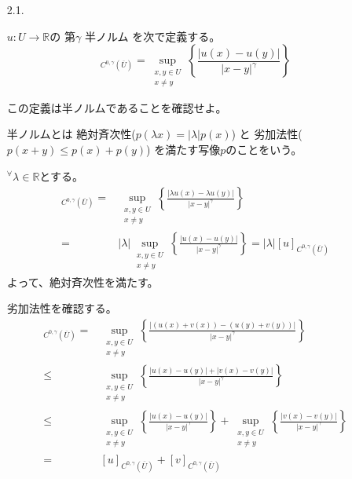 \documentclass[12pt,b5paper]{ltjsarticle}
\begin{document}
\hrulefill

\begin{enumerate}
 \item [2.1.]

       $u:U\to\mathbb{R}$の
       第$\gamma$  半ノルム
       を次で定義する。
       \begin{equation}
        [u]_{C^{0,\gamma}(\overline{U})}
          =
          \sup_{\substack{x,y\in U \\ x \ne y}}
          \left\{
           \frac{\lvert u(x)-u(y) \rvert}{\lvert x-y \rvert^{\gamma}}
          \right\}
       \end{equation}

       この定義は半ノルムであることを確認せよ。

       \dotfill

       半ノルムとは
       絶対斉次性($p(\lambda x) = \lvert \lambda \rvert p(x)$)
       と
       劣加法性($p(x+y)\leq p(x)+p(y)$)
       を満たす写像$p$のことをいう。

       ${}^{\forall}\lambda \in \mathbb{R}$とする。
       \begin{align}
        [\lambda u]_{C^{0,\gamma}(\overline{U})}
         =&
          \sup_{\substack{x,y\in U \\ x \ne y}}
          \left\{
           \frac{\lvert \lambda u(x)- \lambda u(y) \rvert}{\lvert x-y \rvert^{\gamma}}
          \right\}\\
          =&
          \lvert \lambda \rvert \sup_{\substack{x,y\in U \\ x \ne y}}
          \left\{
           \frac{\lvert u(x)- u(y) \rvert}{\lvert x-y \rvert^{\gamma}}
          \right\}
          =
          \lvert \lambda \rvert [u]_{C^{0,\gamma}(\overline{U})}
       \end{align}
       よって、絶対斉次性を満たす。

       劣加法性を確認する。
       \begin{align}
        [u+v]_{C^{0,\gamma}(\overline{U})}
         =&
          \sup_{\substack{x,y\in U \\ x \ne y}}
          \left\{
           \frac{\lvert (u(x)+v(x))- (u(y)+v(y)) \rvert}{\lvert x-y \rvert^{\gamma}}
          \right\}\\
          \leq &
          \sup_{\substack{x,y\in U \\ x \ne y}}
          \left\{
           \frac{\lvert u(x)- u(y) \rvert + \lvert v(x)-v(y) \rvert}{\lvert x-y \rvert^{\gamma}}
          \right\}\\
          \leq &
          \sup_{\substack{x,y\in U \\ x \ne y}}
          \left\{
           \frac{\lvert u(x)- u(y) \rvert}{\lvert x-y \rvert^{\gamma}}
          \right\}
        +
          \sup_{\substack{x,y\in U \\ x \ne y}}
          \left\{
           \frac{ \lvert v(x)-v(y) \rvert}{\lvert x-y \rvert^{\gamma}}
          \right\}\\
        =&
        [u]_{C^{0,\gamma}(\overline{U})}
        +
        [v]_{C^{0,\gamma}(\overline{U})}
       \end{align}


\end{enumerate}
\end{document}
